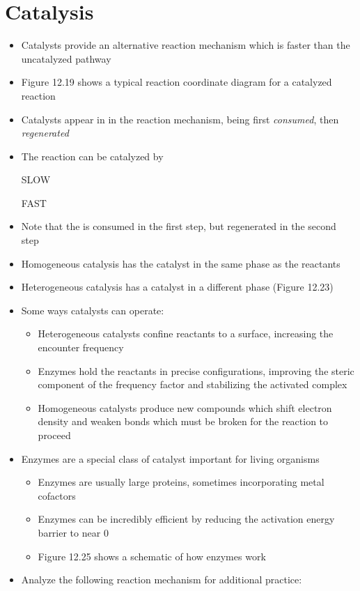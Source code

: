\documentclass[12pt, openany, letterpaper]{memoir}
\begin{document}
\section{Catalysis}
\begin{itemize}
	\item Catalysts provide an alternative reaction mechanism which is faster than the uncatalyzed pathway
	\item Figure 12.19 shows a typical reaction coordinate diagram for a catalyzed reaction
	\item Catalysts appear in in the reaction mechanism, being first \emph{consumed}, then \emph{regenerated}
	\item The reaction  can be catalyzed by 
	
	 \hspace{1em} SLOW
	
	 \hspace{1em} FAST
	\item Note that the  is consumed in the first step, but regenerated in the second step
  \item Homogeneous catalysis has the catalyst in the same phase as the reactants
  \item Heterogeneous catalysis has a catalyst in a different phase (Figure 12.23)
	\item Some ways catalysts can operate:
	\begin{itemize}
		\item Heterogeneous catalysts confine reactants to a surface, increasing the encounter frequency
		\item Enzymes hold the reactants in precise configurations, improving the steric component of the frequency factor and stabilizing the activated complex
		\item Homogeneous catalysts produce new compounds which shift electron density and weaken bonds which must be broken for the reaction to proceed
	\end{itemize}
  \item Enzymes are a special class of catalyst important for living organisms
  \begin{itemize}
    \item Enzymes are usually large proteins, sometimes incorporating metal cofactors
    \item Enzymes can be incredibly efficient by reducing the activation energy barrier to near $0$
    \item Figure 12.25 shows a schematic of how enzymes work
  \end{itemize}
	\item Analyze the following reaction mechanism for additional practice:
	

\end{itemize}
\end{document}
